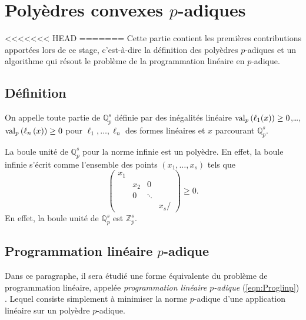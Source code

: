 \section{Polyèdres convexes \texorpdfstring{$p$}{p}-adiques}
\label{sec:polyedre} 
<<<<<<< HEAD
=======
Cette partie contient les premières contributions apportées lors de ce stage, c'est-à-dire la définition des polyèdres $p$-adiques et un algorithme qui résout le problème de la programmation linéaire en $p$-adique.
\subsection{Définition}

\begin{definition}
	On appelle  toute partie de $\mathbb{Q}_{p}^s$ définie par des inégalités linéaire $\text{val}_p\left( \ell_1(x)\right)\ge 0$,\ldots, $ \text{val}_p\left( \ell_n\left( x \right) \right)\ge 0$ pour $ \ell_1,\ldots, \ell_n $ des formes linéaires et $x$ parcourant $\mathbb{Q}_{p} ^s$.


\end{definition}

\begin{ex}
	La boule unité de $\mathbb{Q}_{p}^s$ pour la norme infinie est un polyèdre. En effet, la boule infinie s'écrit comme l'ensemble des points $\left( x_1,\ldots,x_s \right)$ tels que $$
	\begin{pmatrix} x_1 &  & & \\
		  & x_2 &0 &  \\
		&  0& \ddots & \\
		&  & & x_s/
	\end{pmatrix} \ge 0.$$ En effet, la boule unité de $\mathbb{Q}_{p} ^s$ est $\mathbb{Z}_p^s$. %

\end{ex}

\subsection{Programmation linéaire \texorpdfstring{$p$-adique}{p-adique} } 
\label{sectionalgo} 
Dans ce paragraphe, il sera étudié une forme équivalente du problème de programmation linéaire, appelée \textit{programmation linéaire $p$-adique} (\ref{eqn:Proglinp}) . Lequel consiste simplement à minimiser la norme $p$-adique d'une application linéaire sur un polyèdre $p$-adique. 

